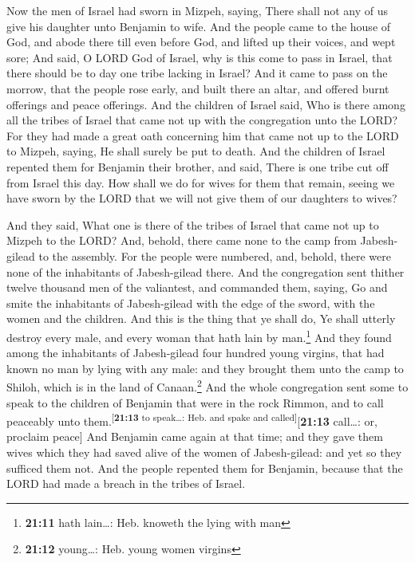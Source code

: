  Now the men of Israel had sworn in Mizpeh, saying, There
shall not any of us give his daughter unto Benjamin to wife.
 And the people came to the house of God, and abode there
till even before God, and lifted up their voices, and wept sore;
 And said, O LORD God of Israel, why is this come to pass
in Israel, that there should be to day one tribe lacking in Israel?
 And it came to pass on the morrow, that the people rose
early, and built there an altar, and offered burnt offerings and peace
offerings.  And the children of Israel said, Who is there
among all the tribes of Israel that came not up with the congregation
unto the LORD? For they had made a great oath concerning him that came
not up to the LORD to Mizpeh, saying, He shall surely be put to death.
 And the children of Israel repented them for Benjamin
their brother, and said, There is one tribe cut off from Israel this
day.  How shall we do for wives for them that remain,
seeing we have sworn by the LORD that we will not give them of our
daughters to wives?

 And they said, What one is there of the tribes of Israel
that came not up to Mizpeh to the LORD? And, behold, there came none to
the camp from Jabesh-gilead to the assembly.  For the
people were numbered, and, behold, there were none of the inhabitants of
Jabesh-gilead there.  And the congregation sent thither
twelve thousand men of the valiantest, and commanded them, saying, Go
and smite the inhabitants of Jabesh-gilead with the edge of the sword,
with the women and the children.  And this is the thing
that ye shall do, Ye shall utterly destroy every male, and every woman
that hath lain by man.\footnote{\textbf{21:11} hath lain\ldots: Heb.
  knoweth the lying with man}  And they found among the
inhabitants of Jabesh-gilead four hundred young virgins, that had known
no man by lying with any male: and they brought them unto the camp to
Shiloh, which is in the land of Canaan.\footnote{\textbf{21:12}
  young\ldots: Heb. young women virgins}  And the whole
congregation sent some to speak to the children of Benjamin that were in
the rock Rimmon, and to call peaceably unto
them.\textsuperscript{{[}\textbf{21:13} to speak\ldots: Heb. and spake
and called{]}}{[}\textbf{21:13} call\ldots: or, proclaim peace{]}
 And Benjamin came again at that time; and they gave them
wives which they had saved alive of the women of Jabesh-gilead: and yet
so they sufficed them not.  And the people repented them
for Benjamin, because that the LORD had made a breach in the tribes of
Israel.

